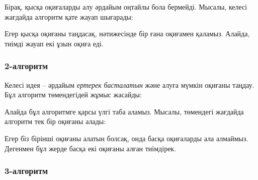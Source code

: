 Бірақ, қысқа оқиғаларды алу әрдайым оңтайлы бола бермейді.
Мысалы, келесі жағдайда алгоритм қате жауап шығарады:
\begin{center}
\end{center}
Егер қысқа оқиғаны таңдасақ, нәтижесінде бір ғана оқиғамен қаламыз.
Алайда, тиімді жауап екі ұзын оқиға еді.

\subsubsection*{2-алгоритм}

Келесі идея -- әрдайым  
\emph{ертерек} \emph{басталатын} және алуға мүмкін
оқиғаны таңдау. Бұл алгоритм төмендегідей жұмыс жасайды:
\begin{center}
\end{center}

Алайда бұл алгоритмге қарсы үлгі таба аламыз.
Мысалы, төмендегі жағдайда алгоритм тек бір оқиғаны 
алады:
\begin{center}
\end{center}
Егер біз бірінші оқиғаны алатын болсақ, онда басқа оқиғаларды
ала алмаймыз. Дегенмен бұл жерде басқа екі оқиғаны алған тиімдірек.

\subsubsection*{3-алгоритм}

